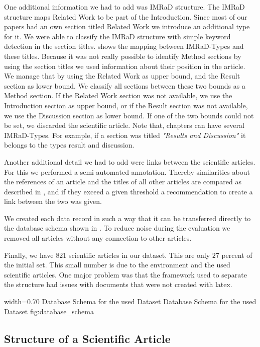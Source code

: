 One additional information we had to add was IMRaD structure. The IMRaD structure maps Related Work to be part of the Introduction. Since most of our papers had an own section titled Related Work we introduce an additional type for it. We were able to classify the IMRaD structure with simple keyword detection in the section titles.  shows the mapping between IMRaD-Types and these titles. Because it was not really possible to identify Method sections by using the section titles we used information about their position in the article. We manage that by using the Related Work as upper bound, and the Result section as lower bound. We classify all sections between these two bounds as a Method section. If the Related Work section was not available, we use the Introduction section as upper bound, or if the Result section was not available, we use the Discussion section as lower bound. If one of the two bounds could not be set, we discarded the scientific article. Note that, chapters can have several IMRaD-Types. For example, if a section was titled \textit{"Results and Discussion"} it belongs to the types result and discussion.

Another additional detail we had to add were links between the scientific articles. For this we performed a semi-automated annotation. Thereby similarities about the references of an article and the titles of all other articles are compared as described in , and if they exceed a given threshold a recommendation to create a link between the two was given.

We created each data record in such a way that it can be transferred directly to the database schema shown in . To reduce noise during the evaluation we removed all articles without any connection to other articles.

Finally, we have $821$ scientific articles in our dataset. This are only $27$ percent of the initial set. This small number is due to the environment and the used scientific articles. One major problem was that the framework used to separate the structure had issues with documents that were not created with latex.

      {width=0.70\textwidth}
      {Database Schema for the used Dataset}
      {Database Schema for the used Dataset}
      {fig:database_schema}

\subsection{Structure of a Scientific Article}
\label{sec:structure_scientific_article}

